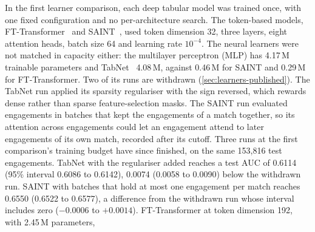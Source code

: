 In the first learner comparison, each deep tabular model was trained once, with one fixed
configuration and no per-architecture search. The token-based models,
FT-Transformer~\cite{gorishniy2021revisiting} and SAINT~\cite{somepalli2021saint}, used token dimension 32, three layers, eight attention heads,
batch size 64 and learning rate $10^{-4}$.
The neural learners were not matched in capacity either: the multilayer perceptron (MLP) has
4.17\,M trainable parameters and TabNet~\cite{arik2021tabnet} 4.08\,M, against 0.46\,M for SAINT
and 0.29\,M for FT-Transformer.
Two of its runs are withdrawn (\cref{sec:learners-published}). The TabNet run applied its sparsity
regulariser with the sign reversed, which rewards dense rather than sparse feature-selection masks. The
SAINT run evaluated engagements in batches that kept the engagements of a match together, so its attention
across engagements could let an engagement attend to later engagements of its own match, recorded after
its cutoff.
Three runs at the first comparison's training budget have since finished, on the same 153,816 test
engagements. TabNet with the regulariser added reaches a test AUC of 0.6114 (95\% interval 0.6086 to
0.6142), 0.0074 (0.0058 to 0.0090) below the withdrawn run. SAINT with batches that hold at most one
engagement per match reaches 0.6550 (0.6522 to 0.6577), a difference from the withdrawn run whose interval
includes zero ($-0.0006$ to $+0.0014$). FT-Transformer at token dimension 192, with 2.45\,M parameters,
